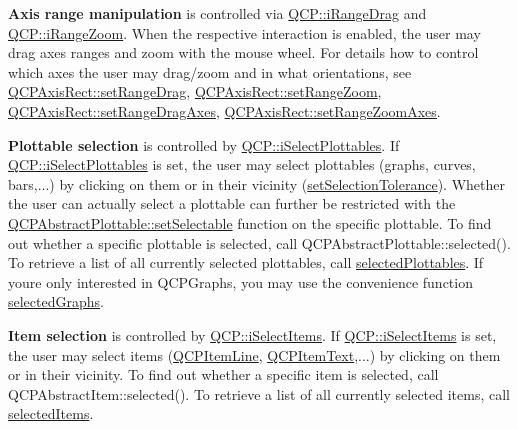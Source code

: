 {\bfseries Axis range manipulation} is controlled via \mbox{\hyperlink{namespace_q_c_p_a2ad6bb6281c7c2d593d4277b44c2b037a2c4432b9aceafb94000be8d1b589ef18}{Q\+C\+P\+::i\+Range\+Drag}} and \mbox{\hyperlink{namespace_q_c_p_a2ad6bb6281c7c2d593d4277b44c2b037abee1e94353525a636aeaf0ba32b72e14}{Q\+C\+P\+::i\+Range\+Zoom}}. When the respective interaction is enabled, the user may drag axes ranges and zoom with the mouse wheel. For details how to control which axes the user may drag/zoom and in what orientations, see \mbox{\hyperlink{class_q_c_p_axis_rect_ae6aef2f7211ba6097c925dcd26008418}{Q\+C\+P\+Axis\+Rect\+::set\+Range\+Drag}}, \mbox{\hyperlink{class_q_c_p_axis_rect_a7960a9d222f1c31d558b064b60f86a31}{Q\+C\+P\+Axis\+Rect\+::set\+Range\+Zoom}}, \mbox{\hyperlink{class_q_c_p_axis_rect_a648cce336bd99daac4a5ca3e5743775d}{Q\+C\+P\+Axis\+Rect\+::set\+Range\+Drag\+Axes}}, \mbox{\hyperlink{class_q_c_p_axis_rect_a9442cca2aa358405f39a64d51eca13d2}{Q\+C\+P\+Axis\+Rect\+::set\+Range\+Zoom\+Axes}}.

{\bfseries Plottable selection} is controlled by \mbox{\hyperlink{namespace_q_c_p_a2ad6bb6281c7c2d593d4277b44c2b037a67148c8227b4155eca49135fc274c7ec}{Q\+C\+P\+::i\+Select\+Plottables}}. If \mbox{\hyperlink{namespace_q_c_p_a2ad6bb6281c7c2d593d4277b44c2b037a67148c8227b4155eca49135fc274c7ec}{Q\+C\+P\+::i\+Select\+Plottables}} is set, the user may select plottables (graphs, curves, bars,...) by clicking on them or in their vicinity (\mbox{\hyperlink{class_q_custom_plot_a4dc31241d7b09680950e19e5f971ed93}{set\+Selection\+Tolerance}}). Whether the user can actually select a plottable can further be restricted with the \mbox{\hyperlink{class_q_c_p_abstract_plottable_a22c69299eb5569e0f6bf084877a37dc4}{Q\+C\+P\+Abstract\+Plottable\+::set\+Selectable}} function on the specific plottable. To find out whether a specific plottable is selected, call Q\+C\+P\+Abstract\+Plottable\+::selected(). To retrieve a list of all currently selected plottables, call \mbox{\hyperlink{class_q_custom_plot_a747faaab57c56891e901a1e97fa4359a}{selected\+Plottables}}. If you\textquotesingle{}re only interested in Q\+C\+P\+Graphs, you may use the convenience function \mbox{\hyperlink{class_q_custom_plot_ad3547aded026d8a9ae6ef13a69080d06}{selected\+Graphs}}.

{\bfseries Item selection} is controlled by \mbox{\hyperlink{namespace_q_c_p_a2ad6bb6281c7c2d593d4277b44c2b037aea2f7c105d674e76d9b187b02ef29260}{Q\+C\+P\+::i\+Select\+Items}}. If \mbox{\hyperlink{namespace_q_c_p_a2ad6bb6281c7c2d593d4277b44c2b037aea2f7c105d674e76d9b187b02ef29260}{Q\+C\+P\+::i\+Select\+Items}} is set, the user may select items (\mbox{\hyperlink{class_q_c_p_item_line}{Q\+C\+P\+Item\+Line}}, \mbox{\hyperlink{class_q_c_p_item_text}{Q\+C\+P\+Item\+Text}},...) by clicking on them or in their vicinity. To find out whether a specific item is selected, call Q\+C\+P\+Abstract\+Item\+::selected(). To retrieve a list of all currently selected items, call \mbox{\hyperlink{class_q_custom_plot_afda487bcf2d6cf1a57173d82495e29ba}{selected\+Items}}.


